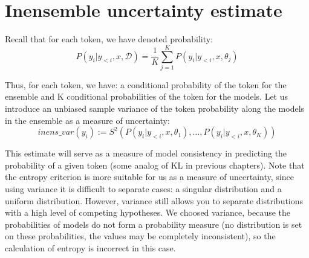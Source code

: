 \documentclass[a4paper,14pt]{extarticle}
\begin{document}
\section{Inensemble uncertainty estimate}
	Recall that for each token, we have denoted probability:
	\begin{equation*}
		P(y_i | y_{<i}, x, \mathcal{D}) = \frac1{K} \sum_{j=1}^{K}P(y_i | y_{<i}, x, \theta_j)
	\end{equation*}
	
	Thus, for each token, we have: a conditional probability of the token for the ensemble and K conditional probabilities of the token for the models. Let us introduce an unbiased sample variance of the token probability along the models in the ensemble as a measure of uncertainty:
	\begin{equation}
		inens\_var(y_i) := S^2(P(y_i | y_{<i}, x, \theta_1), \dots, P(y_i | y_{<i}, x, \theta_K))
	\end{equation}
	
	This estimate will serve as a measure of model consistency in predicting the probability of a given token (some analog of KL in previous chapters). Note that the entropy criterion is more suitable for us as a measure of uncertainty, since using variance it is difficult to separate cases: a singular distribution and a uniform distribution. However, variance still allows you to separate distributions with a high level of competing hypotheses. We choosed variance, because the probabilities of models do not form a probability measure (no distribution is set on these probabilities, the values may be completely inconsistent), so the calculation of entropy is incorrect in this case.
	
\end{document}
